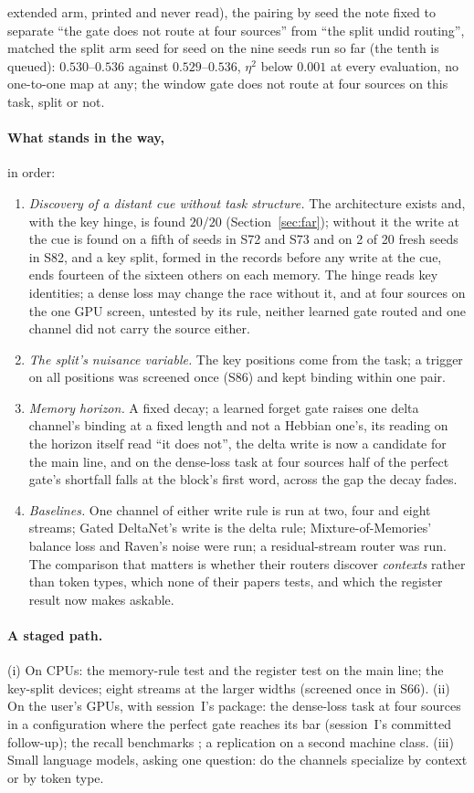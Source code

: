 \documentclass[11pt]{article}
\begin{document}
extended arm, printed and never read), the pairing by seed the note fixed to separate ``the gate does not route at four sources'' from ``the split undid routing'', matched the split arm seed for seed on the nine seeds run so far (the tenth is queued): $0.530$--$0.536$ against $0.529$--$0.536$, $\eta^2$ below $0.001$ at every evaluation, no one-to-one map at any; the window gate does not route at four sources on this task, split or not.

\paragraph{What stands in the way,} in order:
\begin{enumerate}
\item \emph{Discovery of a distant cue without task structure.} The architecture exists and, with the key hinge, is found $20/20$ (Section~\ref{sec:far}); without it the write at the cue is found on a fifth of seeds in S72 and S73 and on 2 of 20 fresh seeds in S82, and a key split, formed in the records before any write at the cue, ends fourteen of the sixteen others on each memory. The hinge reads key identities; a dense loss may change the race without it, and at four sources on the one GPU screen, untested by its rule, neither learned gate routed and one channel did not carry the source either.
\item \emph{The split's nuisance variable.} The key positions come from the task; a trigger on all positions was screened once (S86) and kept binding within one pair.
\item \emph{Memory horizon.} A fixed decay; a learned forget gate raises one delta channel's binding at a fixed length and not a Hebbian one's, its reading on the horizon itself read ``it does not'', the delta write is now a candidate for the main line, and on the dense-loss task at four sources half of the perfect gate's shortfall falls at the block's first word, across the gap the decay fades.
\item \emph{Baselines.} One channel of either write rule is run at two, four and eight streams; Gated DeltaNet's write is the delta rule; Mixture-of-Memories' balance loss and Raven's noise were run; a residual-stream router was run. The comparison that matters is whether their routers discover \emph{contexts} rather than token types, which none of their papers tests, and which the register result now makes askable.
\end{enumerate}

\paragraph{A staged path.} (i) On CPUs: the memory-rule test and the register test on the main line; the key-split devices; eight streams at the larger widths (screened once in S66). (ii) On the user's GPUs, with session~I's package: the dense-loss task at four sources in a configuration where the perfect gate reaches its bar (session~I's committed follow-up); the recall benchmarks \cite{zoology}; a replication on a second machine class. (iii) Small language models, asking one question: do the channels specialize by context or by token type.
\end{document}
